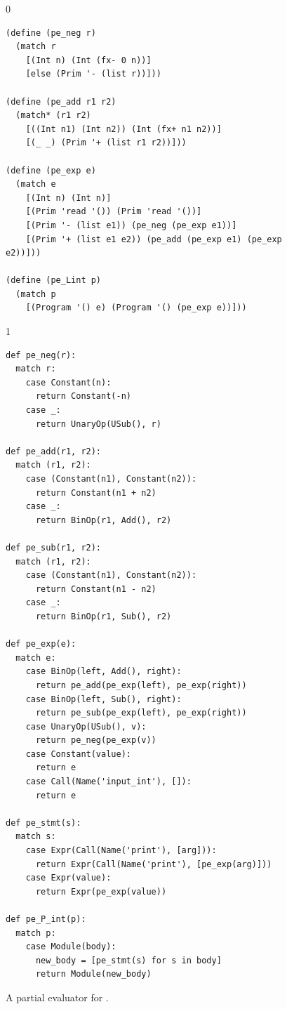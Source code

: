 \documentclass[7x10]{TimesAPriori_MIT}%
\def\racketEd{0}
\def\pythonEd{1}
\def\edition{1}
\begin{document}
\begin{figure}[tp]
{\if\edition\racketEd
\begin{lstlisting}
(define (pe_neg r)
  (match r
    [(Int n) (Int (fx- 0 n))]
    [else (Prim '- (list r))]))

(define (pe_add r1 r2)
  (match* (r1 r2)
    [((Int n1) (Int n2)) (Int (fx+ n1 n2))]
    [(_ _) (Prim '+ (list r1 r2))]))

(define (pe_exp e)
  (match e
    [(Int n) (Int n)]
    [(Prim 'read '()) (Prim 'read '())]
    [(Prim '- (list e1)) (pe_neg (pe_exp e1))]
    [(Prim '+ (list e1 e2)) (pe_add (pe_exp e1) (pe_exp e2))]))

(define (pe_Lint p)
  (match p
    [(Program '() e) (Program '() (pe_exp e))]))
\end{lstlisting}
\fi}
{\if\edition\pythonEd
\begin{lstlisting}
def pe_neg(r):
  match r:
    case Constant(n):
      return Constant(-n)
    case _:
      return UnaryOp(USub(), r)
  
def pe_add(r1, r2):
  match (r1, r2):
    case (Constant(n1), Constant(n2)):
      return Constant(n1 + n2)
    case _:
      return BinOp(r1, Add(), r2)

def pe_sub(r1, r2):
  match (r1, r2):
    case (Constant(n1), Constant(n2)):
      return Constant(n1 - n2)
    case _:
      return BinOp(r1, Sub(), r2)
      
def pe_exp(e):
  match e:
    case BinOp(left, Add(), right):
      return pe_add(pe_exp(left), pe_exp(right))
    case BinOp(left, Sub(), right):
      return pe_sub(pe_exp(left), pe_exp(right))
    case UnaryOp(USub(), v):
      return pe_neg(pe_exp(v))
    case Constant(value):
      return e
    case Call(Name('input_int'), []):
      return e            

def pe_stmt(s):
  match s:
    case Expr(Call(Name('print'), [arg])):
      return Expr(Call(Name('print'), [pe_exp(arg)]))
    case Expr(value):
      return Expr(pe_exp(value))

def pe_P_int(p):
  match p:
    case Module(body):
      new_body = [pe_stmt(s) for s in body]
      return Module(new_body)
\end{lstlisting}
\fi}
\caption{A partial evaluator for \LangInt{}.}
\label{fig:pe-arith}
\end{figure}
\end{document}
